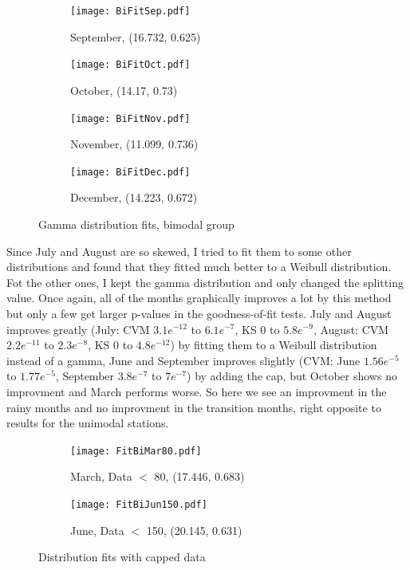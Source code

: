\documentclass{article}
\begin{document}
	\begin{figure}[H]
		\ContinuedFloat
		\centering
		\begin{subfigure}{0.5\textwidth}
			\centering
			\texttt{[image: BiFitSep.pdf]}
			\caption{September, (16.732, 0.625)}
		\end{subfigure}%
		\begin{subfigure}{0.5\textwidth}
			\centering
			\texttt{[image: BiFitOct.pdf]}
			\caption{October, (14.17, 0.73)}
		\end{subfigure}
		\begin{subfigure}{0.5\textwidth}
			\texttt{[image: BiFitNov.pdf]}
			\caption{November, (11.099, 0.736)}
		\end{subfigure}%
		\begin{subfigure}{0.5\textwidth}
			\texttt{[image: BiFitDec.pdf]}
			\caption{December, (14.223, 0.672)}
		\end{subfigure}
		\caption{Gamma distribution fits, bimodal group}
	\end{figure}
	Since July and August are so skewed, I tried to fit them to some other distributions and found that they fitted much better to a Weibull distribution. Fot the other ones, I kept the gamma distribution and only changed the splitting value. Once again, all of the months graphically improves a lot by this method but only a few get larger p-values in the goodness-of-fit tests. July and August improves greatly (July: CVM $3.1e^{-12}$ to $6.1e^{-7}$, KS 0 to $5.8e^{-9}$, August: CVM $2.2e^{-11}$ to $2.3e^{-8}$, KS 0 to $4.8e^{-12}$) by fitting them to a Weibull distribution instead of a gamma, June and September improves slightly (CVM: June $1.56e^{-5}$ to $1.77e^{-5}$, September $3.8e^{-7}$ to $7e^{-7}$) by adding the cap, but October shows no improvment and March performs worse. So here we see an improvment in the rainy months and no improvment in the transition months, right opposite to results for the unimodal stations.
	\begin{figure}[H]
		\ContinuedFloat*
		\centering
		\begin{subfigure}{0.5\textwidth}
			\centering
			\texttt{[image: FitBiMar80.pdf]}
			\caption{March, Data $<$ 80, (17.446, 0.683)}
		\end{subfigure}%
		\begin{subfigure}{0.5\textwidth}
			\centering
			\texttt{[image: FitBiJun150.pdf]}
			\caption{June, Data $<$ 150, (20.145, 0.631)}
		\end{subfigure}
	\caption{Distribution fits with capped data}
	\label{BiCap}
	\end{figure}
\end{document}
